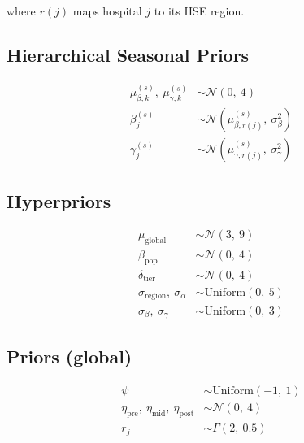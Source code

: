 \documentclass{article}
\begin{document}
where $r(j)$ maps hospital $j$ to its HSE region.

\subsection*{Hierarchical Seasonal Priors}

\begin{align}
  \mu_{\beta,k}^{(s)},\ \mu_{\gamma,k}^{(s)} &\sim \mathcal{N}(0,\ 4) \\[4pt]
  \beta_j^{(s)} &\sim \mathcal{N}\!\left(\mu_{\beta,r(j)}^{(s)},\ \sigma_\beta^2\right) \\
  \gamma_j^{(s)} &\sim \mathcal{N}\!\left(\mu_{\gamma,r(j)}^{(s)},\ \sigma_\gamma^2\right)
\end{align}

\subsection*{Hyperpriors}

\begin{align}
  \mu_{\text{global}} &\sim \mathcal{N}(3,\ 9) \\
  \beta_{\text{pop}} &\sim \mathcal{N}(0,\ 4) \\
  \delta_{\text{tier}} &\sim \mathcal{N}(0,\ 4) \\
  \sigma_{\text{region}},\ \sigma_\alpha &\sim \mathrm{Uniform}(0,\ 5) \\
  \sigma_\beta,\ \sigma_\gamma &\sim \mathrm{Uniform}(0,\ 3)
\end{align}

\subsection*{Priors (global)}

\begin{align}
  \psi &\sim \mathrm{Uniform}(-1,\ 1) \\
  \eta_{\text{pre}},\ \eta_{\text{mid}},\ \eta_{\text{post}} &\sim \mathcal{N}(0,\ 4) \\
  r_j &\sim \Gamma(2,\ 0.5)
\end{align}
\end{document}
